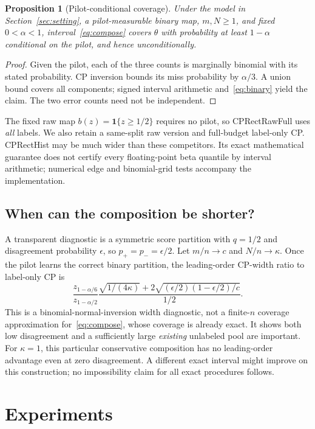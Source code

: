 \documentclass{article}
\newtheorem{proposition}[theorem]{Proposition}
\newcommand{\ind}{\mathbf{1}}
\begin{document}
\begin{proposition}[Pilot-conditional coverage]
\label{prop:finite}
Under the model in Section~\ref{sec:setting}, a pilot-measurable binary map, $m,N\ge1$, and fixed $0<\alpha<1$, interval~\eqref{eq:compose} covers $\theta$ with probability at least $1-\alpha$ conditional on the pilot, and hence unconditionally.
\end{proposition}
\begin{proof}
Given the pilot, each of the three counts is marginally binomial with its stated probability. CP inversion bounds its miss probability by $\alpha/3$. A union bound covers all components; signed interval arithmetic and~\eqref{eq:binary} yield the claim. The two error counts need not be independent.
\end{proof}

The fixed raw map $b(z)=\ind\{z\ge1/2\}$ requires no pilot, so CPRectRawFull uses \emph{all} labels. We also retain a same-split raw version and full-budget label-only CP. CPRectHist may be much wider than these competitors. Its exact mathematical guarantee does not certify every floating-point beta quantile by interval arithmetic; numerical edge and binomial-grid tests accompany the implementation.

\subsection{When can the composition be shorter?}
A transparent diagnostic is a symmetric score partition with $q=1/2$ and disagreement probability $\epsilon$, so $p_+=p_-=\epsilon/2$. Let $m/n\to c$ and $N/n\to\kappa$. Once the pilot learns the correct binary partition, the leading-order CP-width ratio to label-only CP is
\begin{equation}
 \frac{z_{1-\alpha/6}}{z_{1-\alpha/2}}
 \frac{\sqrt{1/(4\kappa)}+
 2\sqrt{(\epsilon/2)(1-\epsilon/2)/c}}{1/2}.
 \label{eq:cplimit}
\end{equation}
This is a binomial-normal-inversion width diagnostic, not a finite-$n$ coverage approximation for~\eqref{eq:compose}, whose coverage is already exact. It shows both low disagreement and a sufficiently large \emph{existing} unlabeled pool are important. For $\kappa=1$, this particular conservative composition has no leading-order advantage even at zero disagreement. A different exact interval might improve on this construction; no impossibility claim for all exact procedures follows.

\section{Experiments}
\label{sec:experiments}
\end{document}
